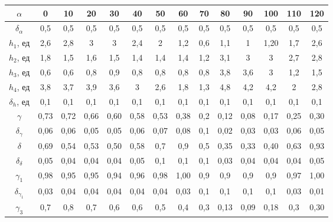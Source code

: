 \documentclass[a4paper, 12pt]{article}%
\begin{document}
\begin{enumerate}
\begin{table}[h!]
\begin{center}
\begin{tabular}{|c|c|c|c|c|c|c|c|c|c|c|c|c|c|}
\hline
$\alpha$               & 0    & 10   & 20   & 30   & 40   & 50    & 60    & 70    & 80    & 90    & 100    & 110    & 120    \\ \hline
$\delta_{\alpha}$      & 0,5  & 0,5  & 0,5  & 0,5  & 0,5  & 0,5   & 0,5   & 0,5   & 0,5   & 0,5   & 0,5    & 0,5    & 0,5    \\ \hline
$h_1$, ед              & 2,6  & 2,8  & 3    & 3    & 2,4  & 2     & 1,2   & 0,6   & 1,1   & 1     & 1,20   & 1,7    & 2,6    \\ \hline
$h_2$, ед              & 1,8  & 1,5  & 1,6  & 1,5  & 1,4  & 1,4   & 1,4   & 1,2   & 3,1   & 3     & 3      & 2,7    & 2,8    \\ \hline
$h_3$, ед              & 0,6  & 0,6  & 0,8  & 0,9  & 0,8  & 0,8   & 0,8   & 0,8   & 3,8   & 3,6   & 3      & 1,2    & 1,5    \\ \hline
$h_4$, ед              & 3,8  & 3,7  & 3,9  & 3,6  & 3    & 2,6   & 1,8   & 1,3   & 4,8   & 4,2   & 4,2    & 2      & 2,8    \\ \hline
$\delta_h$, ед         & 0,1  & 0,1  & 0,1  & 0,1  & 0,1  & 0,1   & 0,1   & 0,1   & 0,1   & 0,1   & 0,1    & 0,1    & 0,1    \\ \hline
$\gamma$               & 0,73 & 0,72 & 0,66 & 0,60 & 0,58 & 0,53  & 0,38  & 0,2   & 0,12  & 0,08  & 0,17   & 0,25   & 0,30   \\ \hline
$\delta_{\gamma}$      & 0,06 & 0,06 & 0,05 & 0,05 & 0,06 & 0,07  & 0,08  & 0,1   & 0,02  & 0,03  & 0,03   & 0,06   & 0,05   \\ \hline
$\delta$               & 0,69 & 0,54 & 0,53 & 0,50 & 0,58 & 0,7   & 0,9   & 0,5   & 0,35  & 0,33  & 0,40   & 0,63   & 0,93   \\ \hline
$\delta_{\delta}$      & 0,05 & 0,04 & 0,04 & 0,04 & 0,05 & 0,1   & 0,1   & 0,1   & 0,03  & 0,04  & 0,04   & 0,04   & 0,05   \\ \hline
$\gamma_1$             & 0,98 & 0,95 & 0,95 & 0,94 & 0,96 & 0,98  & 1,00  & 0,9   & 0,9   & 0,9   & 0,9    & 0,97   & 1,00   \\ \hline
$\delta_{\gamma_1}$    & 0,03 & 0,04 & 0,04 & 0,04 & 0,04 & 0,04  & 0,03  & 0,1   & 0,1   & 0,1   & 0,1    & 0,03   & 0,01   \\ \hline
$\gamma_3$             & 0,7  & 0,8  & 0,7  & 0,6  & 0,6  & 0,5   & 0,4   & 0,3   & 0,13  & 0,09  & 0,18   & 0,3    & 0,30   \\ \hline

\end{tabular}
\end{center}
\end{table}
\end{enumerate}
\end{document}

